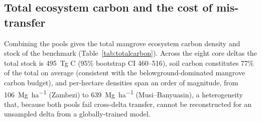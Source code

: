 \documentclass[11pt]{article}
\begin{document}
\begin{table}[t]
\centering
\caption{Mangrove blue carbon versus terrestrial soil organic carbon under the same
out-of-region protocol. Terrestrial soil carbon, evaluated on $\sim$133{,}000
globally-distributed WoSIS profiles under leave-one-continent-out, transfers far better
than mangrove blue carbon: positive correlation and $R^2$ out of region versus near-zero
correlation and zero AOA coverage for mangroves.}
\label{tab:terrestrial}

\end{table}

\subsection{Total ecosystem carbon and the cost of mis-transfer}
Combining the pools gives the total mangrove ecosystem carbon density and stock of the
benchmark (Table~\ref{tab:totalcarbon}). Across the eight core deltas the total stock
is \SI{495}{\tera\gram} C (95\% bootstrap CI 460--516), soil carbon constitutes 77\% of
the total on average
(consistent with the belowground-dominated mangrove carbon budget), and per-hectare
densities span an order of magnitude, from \SI{106}{\mega\gram\per\hectare} (Zambezi)
to \SI{639}{\mega\gram\per\hectare} (Musi--Banyuasin), a heterogeneity that, because
both pools fail cross-delta transfer, cannot be reconstructed for an unsampled delta from
a globally-trained model.

\begin{table}[t]
\centering
\caption{Total ecosystem carbon per core delta: mean AGB-C, median SOC, their sum
(Mg\,ha$^{-1}$), the soil-carbon fraction, and the delta stock (Tg\,C $=$ density
$\times$ mangrove area).}
\label{tab:totalcarbon}

\end{table}
\end{document}

